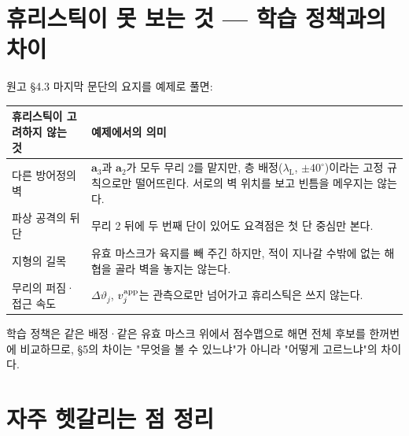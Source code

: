 \documentclass[11pt,a4paper]{article}
\newcommand{\bfa}{\mathbf{a}}
\newcommand{\lamL}{\lambda_{\mathrm{L}}}
\begin{document}
\section{휴리스틱이 못 보는 것 --- 학습 정책과의 차이}

원고 \S4.3 마지막 문단의 요지를 예제로 풀면:
\begin{table}[H]
\centering\small
\begin{tabularx}{\textwidth}{>{\raggedright\arraybackslash}p{} >{\raggedright\arraybackslash}X}
\toprule
휴리스틱이 고려하지 않는 것 & 예제에서의 의미 \\
\midrule
다른 방어정의 벽 & $\bfa_3$과 $\bfa_2$가 모두 무리 2를 맡지만, 층 배정($\lamL$, $\pm40^\circ$)이라는 고정 규칙으로만 떨어뜨린다. 서로의 벽 위치를 보고 빈틈을 메우지는 않는다. \\
파상 공격의 뒤 단 & 무리 2 뒤에 두 번째 단이 있어도 요격점은 첫 단 중심만 본다. \\
지형의 길목 & 유효 마스크가 육지를 빼 주긴 하지만, 적이 지나갈 수밖에 없는 해협을 골라 벽을 놓지는 않는다. \\
무리의 퍼짐·접근 속도 & $\Delta\vartheta_j$, $v^{\rm app}_j$는 관측으로만 넘어가고 휴리스틱은 쓰지 않는다. \\
\bottomrule
\end{tabularx}
\end{table}
학습 정책은 같은 배정·같은 유효 마스크 위에서 점수맵으로 해면 전체 후보를 한꺼번에 비교하므로, \S5의 차이는 "무엇을 볼 수 있느냐"가 아니라 "어떻게 고르느냐"의 차이다.

\section{자주 헷갈리는 점 정리}
\end{document}
